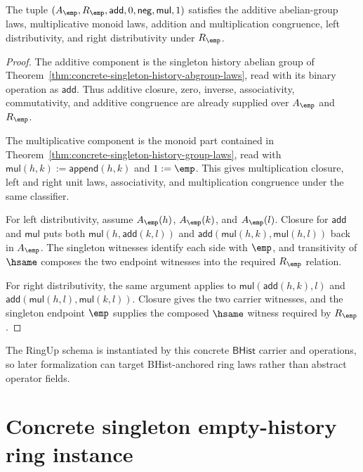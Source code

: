 \begin{theorem}
\label{thm:concrete-singleton-history-ring-laws}
The tuple
$(A_{\emp},R_{\emp},\mathsf{add},0,\mathsf{neg},\mathsf{mul},1)$ satisfies
the additive abelian-group laws, multiplicative monoid laws, addition and
multiplication congruence, left distributivity, and right distributivity under
$R_{\emp}$.
\end{theorem}
\begin{proof}
The additive component is the singleton history abelian group of
Theorem~\ref{thm:concrete-singleton-history-abgroup-laws}, read with its
binary operation as $\mathsf{add}$. Thus additive closure, zero, inverse,
associativity, commutativity, and additive congruence are already supplied over
$A_{\emp}$ and $R_{\emp}$.

The multiplicative component is the monoid part contained in
Theorem~\ref{thm:concrete-singleton-history-group-laws}, read with
$\mathsf{mul}(h,k):=\mathsf{append}(h,k)$ and $1:=\emp$. This gives
multiplication closure, left and right unit laws, associativity, and
multiplication congruence under the same classifier.

For left distributivity, assume $A_{\emp}(h)$, $A_{\emp}(k)$, and
$A_{\emp}(l)$. Closure for $\mathsf{add}$ and $\mathsf{mul}$ puts both
$\mathsf{mul}(h,\mathsf{add}(k,l))$ and
$\mathsf{add}(\mathsf{mul}(h,k),\mathsf{mul}(h,l))$ back in $A_{\emp}$.
The singleton witnesses identify each side with $\emp$, and transitivity of
$\hsame$ composes the two endpoint witnesses into the required
$R_{\emp}$ relation.

For right distributivity, the same argument applies to
$\mathsf{mul}(\mathsf{add}(h,k),l)$ and
$\mathsf{add}(\mathsf{mul}(h,l),\mathsf{mul}(k,l))$. Closure gives the two
carrier witnesses, and the singleton endpoint $\emp$ supplies the composed
$\hsame$ witness required by $R_{\emp}$.
\end{proof}

The RingUp schema is instantiated by this concrete $\mathsf{BHist}$ carrier and
operations, so later formalization can target BHist-anchored ring laws rather
than abstract operator fields.

\section{Concrete singleton empty-history ring instance}
\label{sec:ring-concrete-singleton-instance}

